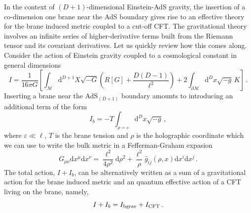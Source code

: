 \documentclass[11pt]{article}
\newcommand{\diff}{\mathrm{d}}
\begin{document}
{In the context of $(D+1)$-dimensional Einstein-AdS gravity, the insertion of a co-dimension one brane near the AdS boundary gives rise to an effective theory for the brane induced metric coupled to a cut-off CFT. The gravitational theory involves an infinite series of higher-derivative terms built from the Riemann tensor and its covariant derivatives. Let us quickly review how this comes along. Consider the action of Einstein gravity coupled to a cosmological constant in general dimensions
\begin{equation}
I=\frac{1}{16\pi G} \left[\int_{\mathcal{M}} \diff^ {D+1}X \sqrt{-G} \left(R[G]+\frac{D(D-1)}{\ell^2} \right)+2\int_{\partial \mathcal{M}}\diff^D x \sqrt{-g} \, K \right]\, .
\end{equation}
Inserting a brane near the AdS$_{(D+1)}$ boundary amounts to introducing an additional term of the form
\begin{equation}
I_b= - T \int_{\rho= \varepsilon} \diff^D x \sqrt{-g}\, ,
\end{equation}
where $\varepsilon \ll \ell$, $T$ is the brane tension and $\rho$ is the holographic coordinate which we can use to write the bulk metric in a Fefferman-Graham expasion \cite{2007arXiv0710.0919F}
\begin{equation}
G_{\mu\nu}\diff x^{\mu}\diff x^{\nu}=\frac{\ell^ 2}{4\rho^ 2} \diff \rho^2 + \frac{\ell^ 2}{\rho} \hat g_{ij} (\rho,x)\diff x^ i\diff x^ j\, .
\end{equation}
The total action, $I+I_b$, can be alternatively written as a sum of a gravitational action for the brane induced metric and an quantum effective action of a CFT living on the brane, namely,
\begin{equation}
I+I_b = I_{\rm bgrav}+ I_{\rm CFT}\, .
\end{equation}
}
\end{document}

